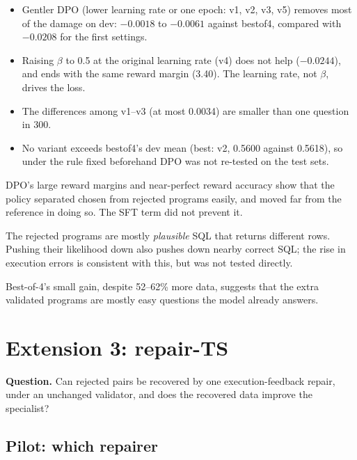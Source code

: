 

\begin{observation}
\begin{itemize}
\item Gentler DPO (lower learning rate or one epoch: v1, v2, v3, v5) removes most of the damage on dev:
$-0.0018$ to $-0.0061$ against bestof4, compared with $-0.0208$ for the first settings.
\item Raising $\beta$ to 0.5 at the original learning rate (v4) does not help ($-0.0244$), and ends with the same
reward margin (3.40). The learning rate, not $\beta$, drives the loss.
\item The differences among v1--v3 (at most 0.0034) are smaller than one question in 300.
\item No variant exceeds bestof4's dev mean (best: v2, 0.5600 against 0.5618), so under the rule fixed beforehand DPO
was not re-tested on the test sets.
\end{itemize}
\end{observation}

\begin{interpretation}
DPO's large reward margins and near-perfect reward accuracy show that the policy separated chosen from rejected
programs easily, and moved far from the reference in doing so. The SFT term did not prevent it.

The rejected programs are mostly \emph{plausible} SQL that returns different rows. Pushing their likelihood down also
pushes down nearby correct SQL; the rise in execution errors is consistent with this, but was not tested directly.

Best-of-4's small gain, despite 52--62\% more data, suggests that the extra validated programs are mostly easy
questions the model already answers.
\end{interpretation}

\section{Extension 3: repair-TS}\label{sec:ext-repair}

\textbf{Question.} Can rejected pairs be recovered by one execution-feedback repair, under an unchanged validator, and
does the recovered data improve the specialist?

\subsection{Pilot: which repairer}

